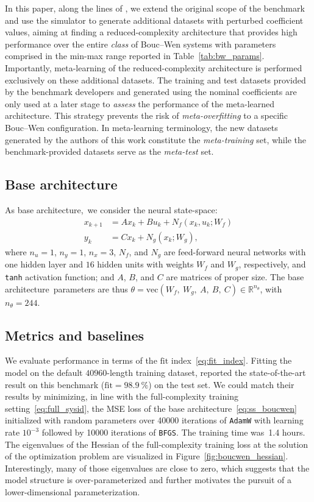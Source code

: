 \documentclass{article}
\newcommand{\base}{{base architecture}}
\newcommand{\R}{\mathbb{R}}
\newcommand{\fullpar}{\theta}
\begin{document}
In this paper, along the lines of \cite{chakrabarty2025meta}, we extend the original scope of the benchmark~\cite{noel2016hysteretic} and use the simulator to generate additional datasets with perturbed coefficient values, aiming at finding a reduced-complexity architecture that provides high performance over the entire \emph{class} of Bouc--Wen systems with parameters comprised in the min-max range reported in Table~\ref{tab:bw_params}. Importantly, meta-learning of the reduced-complexity architecture is performed exclusively on these additional datasets. The training and test datasets provided by the benchmark developers and generated using the nominal coefficients are only used at a later stage to \emph{assess} the performance of the meta-learned architecture. This strategy prevents the risk of \emph{meta-overfitting} to a specific Bouc--Wen configuration. In meta-learning terminology, the new datasets generated by the authors of this work constitute the \emph{meta-training} set, while the benchmark-provided datasets serve as the \emph{meta-test} set.

\subsection{Base architecture}
As \base,\ we consider the neural state-space:
\begin{subequations}
\label{eq:ss_boucwen}
\begin{align}
    x_{k+1} &= A x_k + B u_k + N_f(x_k, u_k; W_f) \\
    y_{k} &= C x_k +  N_g(x_k; W_g),
\end{align}
\end{subequations}
where $n_u=1$, $n_y=1$, $n_x=3$, $N_f$, and $N_g$ are feed-forward neural networks with one hidden layer and $16$ hidden units with weights $W_f$ and $W_g$, respectively, and \texttt{tanh} activation function; and $A$, $B$, and $C$ are matrices of proper size. The \base\ parameters are thus $\fullpar = \mathrm{vec}(W_f,\ W_g,\ A,\ B,\ C) \in \R^{n_\fullpar}$, with $n_\fullpar=244$.

\subsection{Metrics and baselines}
We evaluate performance in terms of the $\mathrm{fit}$ index~\eqref{eq:fit_index}.
Fitting the model on the default $40960$-length training dataset, \cite{schoukens2021improved} reported the state-of-the-art result on this benchmark ($\mathrm{fit}=98.9~\%$) on the test set. We could match their results by minimizing, in line with the full-complexity training setting~\eqref{eq:full_sysid}, the MSE loss of the \base\ \eqref{eq:ss_boucwen} initialized with random parameters over 40000 iterations of \texttt{AdamW} with learning rate $10^{-3}$ followed by 10000 iterations of \texttt{BFGS}. The training time was~1.4 hours.
The eigenvalues of the Hessian of the full-complexity training loss at the solution of the optimization problem are visualized in Figure~\ref{fig:boucwen_hessian}.
Interestingly, many of those eigenvalues are close to zero, which suggests that the model structure is over-parameterized and further motivates the pursuit of a lower-dimensional parameterization.
\end{document}
